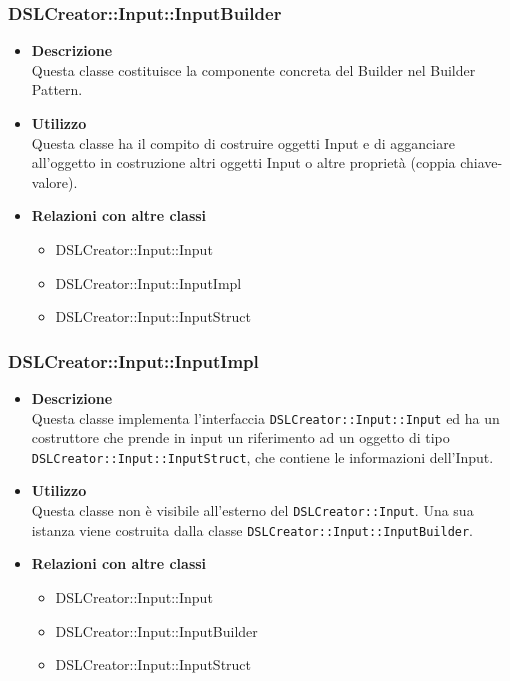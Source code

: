 \subsubsection{DSLCreator::Input::InputBuilder}
                    \begin{itemize}
                        \item \textbf{Descrizione} \hfill \\
                          Questa classe costituisce la componente concreta del Builder nel Builder Pattern.
                        \item \textbf{Utilizzo} \hfill \\
                          Questa classe ha il compito di costruire oggetti Input e di agganciare all'oggetto in costruzione altri oggetti Input o altre proprietà (coppia chiave-valore).
                        \item \textbf{Relazioni con altre classi}
                            \begin{itemize}
                              \item DSLCreator::Input::Input
                              \item DSLCreator::Input::InputImpl
                              \item DSLCreator::Input::InputStruct
                            \end{itemize}
                    \end{itemize}  

 \subsubsection{DSLCreator::Input::InputImpl}
                    \begin{itemize}
                        \item \textbf{Descrizione} \hfill \\
                          Questa classe implementa l'interfaccia \texttt{DSLCreator::Input::Input} ed ha un costruttore che prende in input un riferimento ad un oggetto di tipo \texttt{DSLCrea\-tor::Input::InputStruct}, che contiene le informazioni dell'Input.
                        \item \textbf{Utilizzo} \hfill \\
                          Questa classe non è visibile all'esterno del  \texttt{DSLCreator::Input}. Una sua istanza viene costruita dalla classe \texttt{DSLCreator::Input::InputBuilder}.
                        \item \textbf{Relazioni con altre classi}
                            \begin{itemize}
                              \item DSLCreator::Input::Input
                              \item DSLCreator::Input::InputBuilder
                              \item DSLCreator::Input::InputStruct
                            \end{itemize}
                    \end{itemize}  

